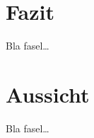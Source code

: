 \chapter{Fazit}
\label{ch:Fazit}
Bla fasel\ldots


\chapter{Aussicht}
\label{ch:Aussicht}
Bla fasel\ldots



